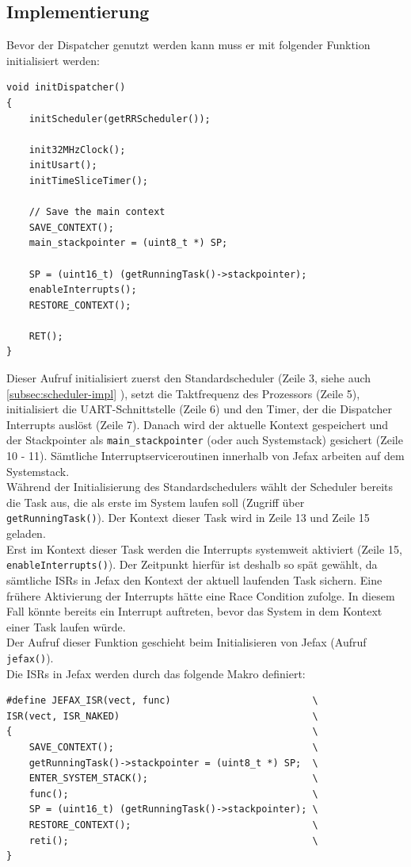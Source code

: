 \documentclass[fontsize=12pt, toc=bibliography, notitlepage]{scrreprt}
\newcommand{\refnn}[1]{\ref{#1} \nameref{#1}}
\begin{document}
\newpage

\subsection{Implementierung}
\label{subsec:dispatcher-impl}
Bevor der Dispatcher genutzt werden kann muss er mit folgender Funktion initialisiert werden:

\begin{lstlisting}[title=dispatcher.c]
void initDispatcher()
{
	initScheduler(getRRScheduler());
	
	init32MHzClock();
	initUsart();
	initTimeSliceTimer();
	
	// Save the main context
	SAVE_CONTEXT();
	main_stackpointer = (uint8_t *) SP;
	
	SP = (uint16_t) (getRunningTask()->stackpointer);
	enableInterrupts();
	RESTORE_CONTEXT();
	
	RET();
}
\end{lstlisting}

Dieser Aufruf initialisiert zuerst den Standardscheduler (Zeile 3, siehe auch \refnn{subsec:scheduler-impl}), setzt die Taktfrequenz des Prozessors (Zeile 5), initialisiert die UART-Schnittstelle (Zeile 6) und den Timer, der die Dispatcher Interrupts auslöst (Zeile 7). Danach wird der aktuelle Kontext gespeichert und der Stackpointer als \lstinline$main_stackpointer$ (oder auch Systemstack) gesichert (Zeile 10 - 11). Sämtliche Interruptserviceroutinen innerhalb von Jefax arbeiten auf dem Systemstack.\\
Während der Initialisierung des Standardschedulers wählt der Scheduler bereits die Task aus, die als erste im System laufen soll (Zugriff über \lstinline$getRunningTask()$). Der Kontext dieser Task wird in Zeile 13 und Zeile 15 geladen.\\
Erst im Kontext dieser Task werden die Interrupts systemweit aktiviert (Zeile 15, \lstinline$enableInterrupts()$). Der Zeitpunkt hierfür ist deshalb so spät gewählt, da sämtliche ISRs in Jefax den Kontext der aktuell laufenden Task sichern. Eine frühere Aktivierung der Interrupts hätte eine Race Condition zufolge. In diesem Fall könnte bereits ein Interrupt auftreten, bevor das System in dem Kontext einer Task laufen würde.\\
Der Aufruf dieser Funktion geschieht beim Initialisieren von Jefax (Aufruf \lstinline$jefax()$).\\
\newpage
Die ISRs in Jefax werden durch das folgende Makro definiert:

\begin{lstlisting}[title=interrupt.h]
#define JEFAX_ISR(vect, func)                         \
ISR(vect, ISR_NAKED)                                  \
{                                                     \
	SAVE_CONTEXT();                                   \
	getRunningTask()->stackpointer = (uint8_t *) SP;  \
	ENTER_SYSTEM_STACK();                             \
	func();                                           \
	SP = (uint16_t) (getRunningTask()->stackpointer); \
	RESTORE_CONTEXT();                                \
	reti();                                           \
}
\end{lstlisting}
\end{document}
